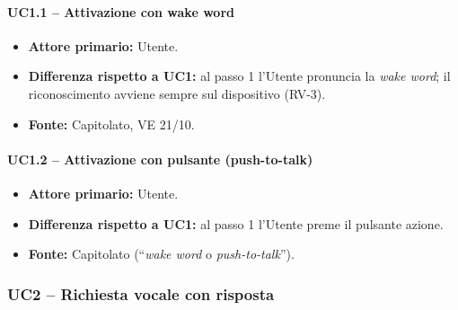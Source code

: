 \documentclass[12pt,a4paper]{article}
\newcommand{\tightlist}{\setlength{\itemsep}{1pt}\setlength{\parskip}{0pt}}
\begin{document}
\paragraph{UC1.1 -- Attivazione con wake word}

\begin{itemize}

\tightlist

\item \textbf{Attore primario:} Utente.

\item \textbf{Differenza rispetto a UC1:} al passo 1 l'Utente pronuncia la \emph{wake word}; il riconoscimento avviene sempre sul dispositivo (RV-3).

\item \textbf{Fonte:} Capitolato, VE 21/10.

\end{itemize}



\paragraph{UC1.2 -- Attivazione con pulsante (push-to-talk)}

\begin{itemize}

\tightlist

\item \textbf{Attore primario:} Utente.

\item \textbf{Differenza rispetto a UC1:} al passo 1 l'Utente preme il pulsante azione.

\item \textbf{Fonte:} Capitolato (``\emph{wake word} o \emph{push-to-talk}'').

\end{itemize}



\subsubsection{UC2 -- Richiesta vocale con risposta}
\end{document}
